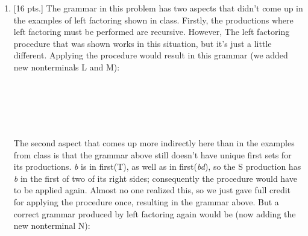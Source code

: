 \documentclass[11pt,fleqn]{article}
\begin{document}
  \begin{enumerate}

    \addtolength{\itemsep}{12mm}


    \item {[16 pts.]} The grammar in this problem has two aspects that
          didn't come up in the examples of left factoring shown in class.
          Firstly, the productions where left factoring must be performed
          are recursive.  However, The left factoring procedure that was
          shown works in this situation, but it's just a little different.
          Applying the procedure would result in this grammar (we added new
          nonterminals L and M):

          \hspace{.2in}%
          \begin{grammar}[1.35]

              \\

              \\

              \\

              \\

          \end{grammar}

          \smallskip

          The second aspect that comes up more indirectly here than in the
          examples from class is that the grammar above still doesn't have
          unique first sets for its productions.  \emph{b} is in first(T),
          as well as in first(\emph{bd}), so the S production has \emph{b}
          in the first of two of its right sides; consequently the procedure
          would have to be applied again.  Almost no one realized this, so
          we just gave full credit for applying the procedure once,
          resulting in the grammar above.  But a correct grammar produced by
          left factoring again would be (now adding the new nonterminal N):


\end{enumerate}
\end{document}
